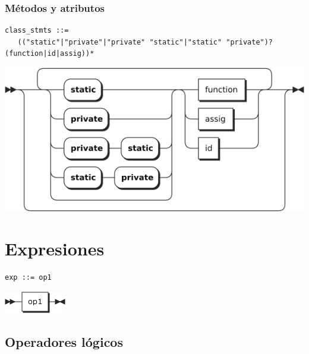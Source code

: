 \subsubsection{Métodos y atributos}
\begin{lstlisting}[style=nonumbers]
class_stmts ::= 
   (("static"|"private"|"private" "static"|"static" "private")? (function|id|assig))*

\end{lstlisting}  	
\begin{center}
\includegraphics[scale=0.7]{diagram/class_stmts.png} \\
\end{center}
\section {Expresiones}
\begin{multicols}{2}
\begin{lstlisting}[style=nonumbers]      
exp ::= op1
\end{lstlisting}  
\columnbreak	
\begin{center}
\includegraphics[scale=0.5]{diagram/exp.png} \\
\end{center}
\end{multicols}
\subsection{Operadores lógicos}
